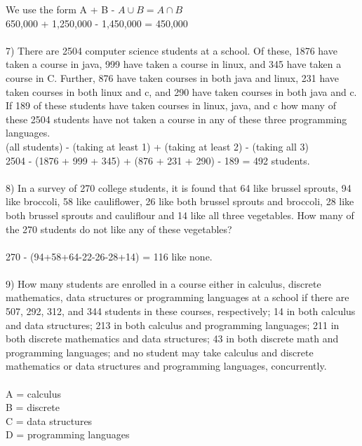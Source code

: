 \documentclass{article}
\begin{document}
\begin{flushleft}
\setlength\parindent{24pt}We use the form A + B - $A \cup B = A \cap B$ \\
\setlength\parindent{24pt}650,000 + 1,250,000 - 1,450,000 = 450,000 \\
~\\
\setlength\parindent{0pt}7) There are 2504 computer science students at a school.  Of these, 1876 have taken a course in java, 999 have taken a course in linux, and 345 have taken a course in C.  Further, 876 have taken courses in both java and linux, 231 have taken courses in both linux and c, and 290 have taken courses in both java and c.  If 189 of these students have taken courses in linux, java, and c how many of these 2504 students have not taken a course in any of these three programming languages. \\
\setlength\parindent{24pt} (all students) - (taking at least 1) + (taking at least 2) - (taking all 3) \\
\setlength\parindent{24pt} 2504 - (1876 + 999 + 345) + (876 + 231 + 290) - 189 = 492 students.\\
~\\
\setlength\parindent{0pt}8) In a survey of 270 college students, it is found that 64 like brussel sprouts, 94 like broccoli, 58 like cauliflower, 26 like both brussel sprouts and broccoli, 28 like both brussel sprouts and cauliflour and 14 like all three vegetables.  How many of the 270 students do not like any of these vegetables?  \\
~\\
\setlength\parindent{24pt}270 - (94+58+64-22-26-28+14) = 116 like none. \\
~\\
\setlength\parindent{0pt}9) How many students are enrolled in a course either in calculus, discrete mathematics, data structures or programming languages at a school if there are 507, 292, 312, and 344 students in these courses, respectively;  14 in both calculus and data structures; 213 in both calculus and programming languages; 211 in both discrete mathematics and data structures; 43 in both discrete math and programming languages; and no student may take calculus and discrete mathematics or data structures and programming languages, concurrently.  \\
~\\
A = calculus \\
B = discrete \\
C = data structures \\ 
D = programming languages \\ 

\end{flushleft}
\end{document}
